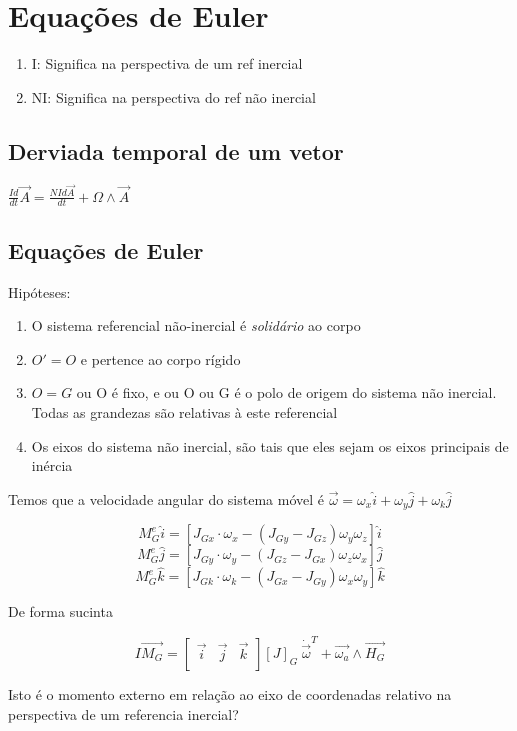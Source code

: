 \section{Equações de Euler}

\begin{enumerate}
	\item I: Significa na perspectiva de um ref inercial
	\item NI: Significa na perspectiva do ref não inercial
\end{enumerate}

\subsection{Derviada temporal de um vetor}

$ \frac{Id}{dt}\vec{A} = \frac{NId\vec{A}}{dt} + \Omega\wedge\vec{A} $

\subsection{Equações de Euler}

Hipóteses:

\begin{enumerate}
	\item O sistema referencial não-inercial é \textit{solidário} ao corpo
	\item $O' = O$ e pertence ao corpo rígido
	\item $O = G$ ou O é fixo, e ou O ou G é o polo de origem do sistema não inercial. Todas as grandezas são relativas à este referencial
	\item Os eixos do sistema não inercial, são tais que eles sejam os eixos principais de inércia
\end{enumerate}

Temos que a velocidade angular do sistema móvel é $\vec{\omega} = \omega_x\hat{i} + \omega_y\hat{j} + \omega_k\hat{j}$

$$ M_G^e\hat{i} = [J_{Gx}\cdot{\omega_x} - (J_{Gy} - J_{Gz})\omega_y \omega_z]\hat{i} $$
$$ M_G^e\hat{j} = [J_{Gy}\cdot{\omega_y} - (J_{Gz} - J_{Gx})\omega_z \omega_x]\hat{j} $$
$$ M_G^e\hat{k} = [J_{Gk}\cdot{\omega_k} - (J_{Gx} - J_{Gy})\omega_x \omega_y]\hat{k} $$

De forma sucinta

$$ I\vec{M_G} = \begin{bmatrix}\vec{i} & \vec{j} & \vec{k} \\ \end{bmatrix}[J]_G\ \dot{\vec{\omega}}^T + \vec{\omega_a}\wedge\vec{H_G}$$

Isto é o momento externo em relação ao eixo de coordenadas relativo na perspectiva de um referencia inercial?

